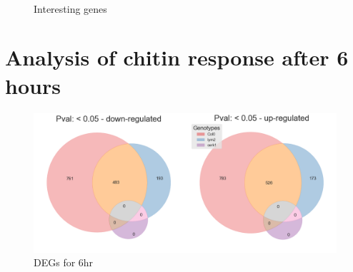 \documentclass[../main.tex]{subfiles}
\begin{document}
\begin{figure}[!ht]
  \centering
  \\
  \caption{Interesting genes}
  \label{fig:interestinggenes}
\end{figure}





\section{Analysis of chitin response after 6 hours}
\label{subsec:deg6}
\begin{figure}[ht]
  \centering
  \includegraphics[width=\columnwidth]{figures/vennTreatmentschitin6.png}
  \caption{\label{fig:6hrDEGs} DEGs for 6hr}
\end{figure}
\end{document}
